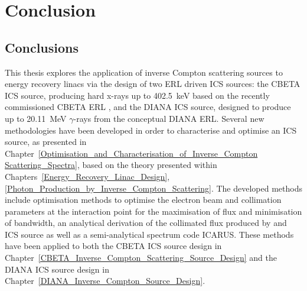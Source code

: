 \documentclass[../main.tex]{subfiles}
\begin{document}
\chapter{Conclusion}
\label{Conclusion} %

\section{Conclusions}

This thesis explores the application of inverse Compton scattering sources to energy recovery linacs via the design of two ERL driven ICS sources: the CBETA ICS source, producing hard x-rays up to 402.5~\si{\kilo\electronvolt} based on the recently commissioned CBETA ERL \cite{bartnik2020cbeta}, and the DIANA ICS source, designed to produce up to 20.11~\si{\mega\electronvolt} $\gamma$-rays from the conceptual DIANA ERL. Several new methodologies have been developed in order to characterise and optimise an ICS source, as presented in Chapter~\ref{Optimisation_and_Characterisation_of_Inverse_Compton Scattering_Spectra}, based on the theory presented within Chapters~\ref{Energy_Recovery_Linac_Design}, \ref{Photon_Production_by_Inverse_Compton_Scattering}. The developed methods include optimisation methods to optimise the electron beam and collimation parameters at the interaction point for the maximisation of flux and minimisation of bandwidth, an analytical derivation of the collimated flux produced by and ICS source as well as a semi-analytical spectrum code \textsc{ICARUS}. These methods have been applied to both the CBETA ICS source design in Chapter~\ref{CBETA_Inverse_Compton_Scattering_Source_Design} and the DIANA ICS source design in Chapter~\ref{DIANA_Inverse_Compton_Source_Design}.
\end{document}
